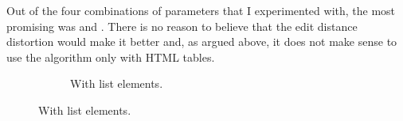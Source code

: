 \documentclass[10pt]{article}
\begin{document}
Out of the four combinations of parameters that I experimented with, the most promising was  and . There is no reason to believe that the edit distance distortion would make it better and, as argued above, it does not make sense to use the algorithm only with HTML tables.

\begin{figure}[!b]

    \centering
    
    \begin{subfigure}[b]{.49\textwidth}
        
        \caption{With list elements.}
        \label{fig:results-with-list}
        

\end{subfigure}
\end{figure}
\end{document}
